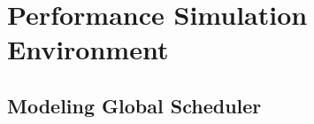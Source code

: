 \chapter{Performance Simulation Environment}
\label{chapter:pse}

\section{Modeling Global Scheduler}

\subsection{}


